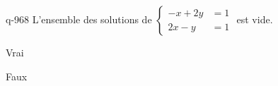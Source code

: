 \begin{truefalse}{q-968}
L'ensemble des solutions de $\begin{cases} -x+2y &= 1 \\ 2x-y &= 1 \end{cases}$ est vide.
\item Vrai
\item* Faux
\end{truefalse}


